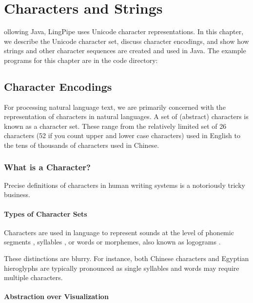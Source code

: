 \chapter{Characters and Strings}\label{chap:char}

ollowing Java, LingPipe uses Unicode character
representations.  In this chapter, we describe the Unicode character
set, discuss character encodings, and show how strings and other character
sequences are created and used in Java.
The example programs for this chapter are in the code directory:
%


\section{Character Encodings}

For processing natural language text, we are primarily concerned with
the representation of characters in natural languages.  A set of
(abstract) characters is known as a character set.  These range from
the relatively limited set of 26 characters (52 if you count upper and
lower case characters) used in English to the tens of thousands of
characters used in Chinese.


\subsection{What is a Character?}

Precise definitions of characters in human writing systems is a
notoriously tricky business.  

\subsubsection{Types of Character Sets}

Characters are used in language to represent sounds at the level of
phonemic segments , syllables , or words or morphemes, also
known as logograms .  

These distinctions are blurry.  For instance, both Chinese characters
and Egyptian hieroglyphs are typically pronounced as single syllables
and words may require multiple characters.

\subsubsection{Abstraction over Visualization}

